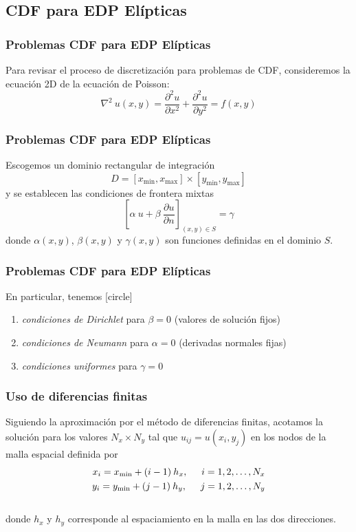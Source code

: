 \subsection{CDF para EDP Elípticas}
\begin{frame}
\frametitle{Problemas CDF para EDP Elípticas}
Para revisar el proceso de discretización para problemas de CDF, consideremos la ecuación 2D de la ecuación de Poisson:
\begin{equation}
\nabla^{2} \: u(x, y) = \dfrac{\partial^{2} u}{\partial x^{2}} + \dfrac{\partial^{2} u}{\partial y^{2}} = f(x, y)
\label{eq:ecuacion_13_01}
\end{equation}
\end{frame}
\begin{frame}
\frametitle{Problemas CDF para EDP Elípticas}
Escogemos un dominio rectangular de integración 
\[ D = [x_{\mbox{min}}, x_{\mbox{max}} ] \times [y_{\mbox{min}}, y_{\mbox{max}} ]  \]
y se establecen las condiciones de frontera mixtas
\begin{equation}
\left[ \alpha \: u + \beta \: \dfrac{\partial u}{\partial n} \right]_{(x, y) \in S} = \gamma
\label{eq:ecuacion_13_02}
\end{equation}
donde $\alpha(x, y)$, $\beta(x, y)$ y $\gamma(x, y)$ son funciones definidas en el dominio $S$.
\end{frame}
\begin{frame}
\frametitle{Problemas CDF para EDP Elípticas}
En particular, tenemos
[circle]
\begin{enumerate}[<+->]
\item \emph{condiciones de Dirichlet} para $\beta = 0$ (valores de solución fijos)
\item \emph{condiciones de Neumann} para $\alpha = 0$ (derivadas normales fijas)
\item \emph{condiciones uniformes} para $\gamma = 0$
\end{enumerate}
\end{frame}
\begin{frame}
\frametitle{Uso de diferencias finitas}
Siguiendo la aproximación por el método de diferencias finitas, acotamos la solución para los valores $N_{x} \times N_{y}$ tal que $u_{ij} = u(x_{i}, y_{j})$ en los nodos de la malla espacial definida por
\begin{align*}
x_{i} = x_{\text{min}} + (i - 1) \: h_{x}, \hspace{0.5cm} i = 1, 2, \ldots, N_{x} \\
y_{i} = y_{\text{min}} + (j - 1) \: h_{y}, \hspace{0.5cm} j = 1, 2, \ldots, N_{y}
\end{align*}
\\
\bigskip
\pause
donde $h_{x}$ y $h_{y}$ corresponde al espaciamiento en la malla en las dos direcciones.
\end{frame}
